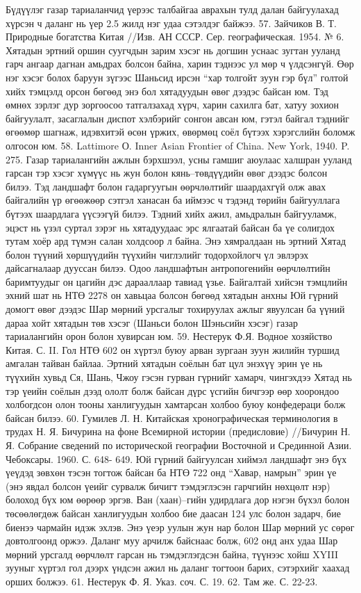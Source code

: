 Бүдүүлэг газар тариаланчид үерээс талбайгаа аврахын тулд далан байгуулахад хүрсэн ч даланг нь үер 2.5 жилд нэг удаа сэтэлдэг байжээ. 57. Зайчиков В. Т. Природные богатства Китая //Изв. АН СССР. Сер. географическая. 1954. № 6.
Хятадын эртний оршин суугчдын зарим хэсэг нь догшин уснаас зугтан ууланд гарч ангаар дагнан амьдрах болсон байна, харин тэднээс ул мөр ч үлдсэнгүй. Өөр нэг хэсэг болох баруун зүгээс Шаньсид ирсэн “хар толгойт зуун гэр бүл” голтой хийх тэмцэлд орсон бөгөөд энэ бол хятадуудын өвөг дээдэс байсан юм. Тэд өмнөх зэрлэг дур зоргоосоо татгалзахад хүрч, харин сахилга бат, хатуу зохион байгуулалт, засаглалын диспот хэлбэрийг сонгон авсан юм, гэтэл байгал тэднийг өгөөмөр шагнаж, идэвхитэй өсөн үржих, өвөрмөц соёл бүтээх хэрэгслийн боломж олгосон юм. 58. Lattimore О. Inner Asian Frontier of China. New York, 1940. P. 275.
Газар тариалангийн ажлын бэрхшээл, усны гамшиг аюулаас халшран ууланд гарсан тэр хэсэг хүмүүс нь жун болон кянь–төвдүүдийн өвөг дээдэс болсон билээ. Тэд ландшафт болон гадаргуугын өөрчлөлтийг шаардахгүй олж авах байгалийн үр өгөөжөөр сэтгэл ханасан ба иймээс ч тэдэнд төрийн байгууллага бүтээх шаардлага үүсээгүй билээ. Тэдний хийх ажил, амьдралын байгууламж, эцэст нь үзэл суртал зэрэг нь хятадуудаас эрс ялгаатай байсан ба үе солигдох тутам хоёр ард түмэн салан холдсоор л байна. Энэ хямралдаан нь эртний Хятад болон түүний хөршүүдийн түүхийн чиглэлийг тодорхойлогч үл эвлэрэх дайсагналаар дууссан билээ.
Одоо ландшафтын антропогенийн өөрчлөлтийн баримтуудыг он цагийн дэс дарааллаар тавиад үзье. Байгалтай хийсэн тэмцлийн эхний шат нь НТӨ 2278 он хавьцаа болсон бөгөөд хятадын анхны Юй гүрний домогт өвөг дээдэс Шар мөрний урсгалыг тохируулах ажлыг явуулсан ба үүний дараа хойт хятадын төв хэсэг (Шаньси болон Шэньсийн хэсэг) газар тариалангийн орон болон хувирсан юм. 59. Нестерук Ф.Я. Водное хозяйство Китая. С. II.
Гол НТӨ 602 он хүртэл буюу арван зургаан зуун жилийн туршид амгалан тайван байлаа. Эртний хятадын соёлын бат цул энэхүү эрин үе нь түүхийн хувьд Ся, Шань, Чжоу гэсэн гурван гүрнийг хамарч, чингэхдээ Хятад нь тэр үеийн соёлын дээд ололт болж байсан дүрс үсгийн бичгээр өөр хоорондоо холбогдсон олон тооны ханлигуудын хамтарсан холбоо буюу конфедераци болж байсан билээ. 60. Гумилев Л. Н. Китайская хронографическая терминология в трудах Н. Я. Бичурина на фоне Всемирной истории (предисловие) //Бичурин Н. Я. Собрание сведений по исторической географии Восточной и Срединной Азии. Чебоксары. 1960. С. 648- 649.
Юй гүрний байгуулсан хиймэл ландшафт энэ бүх үеүдэд зөвхөн тэсэн тогтож байсан ба НТӨ 722 онд “Хавар, намрын” эрин үе (энэ явдал болсон үеийг сурвалж бичигт тэмдэглэсэн гарчгийн нөхцөлт нэр) болоход бүх юм өөрөөр эргэв. Ван (хаан)–гийн удирдлага дор нэгэн бүхэл болон төсөөлөгдөж байсан ханлигуудын холбоо бие даасан 124 улс болон задарч, бие биенээ чармайн идэж эхлэв. Энэ үеэр уулын жун нар болон Шар мөрний ус сөрөг довтолгоонд оржээ. Даланг муу арчилж байснаас болж, 602 онд анх удаа Шар мөрний урсгалд өөрчлөлт гарсан нь тэмдэглэгдсэн байна, түүнээс хойш XYIII зууныг хүртэл гол дээрх үндсэн ажил нь даланг тогтоон барих, сэтэрхийг хаахад орших болжээ. 61. Нестерук Ф. Я. Указ. соч. С. 19. 62. Там же. С. 22-23.
